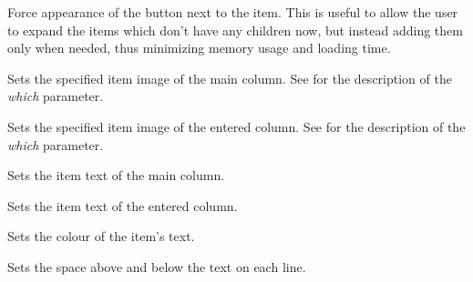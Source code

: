Force appearance of the button next to the item. This is useful to
allow the user to expand the items which don't have any children now,
but instead adding them only when needed, thus minimizing memory
usage and loading time.

\label{wxtreelistctrlsetitemimage}


Sets the specified item image of the main column. See 
for the description of the {\it which} parameter.


Sets the specified item image of the entered column. See 
for the description of the {\it which} parameter.

\label{wxtreelistctrlsetitemtext}


Sets the item text of the main column.


Sets the item text of the entered column.

\label{wxtreelistctrlsetitemtextcolour}


Sets the colour of the item's text.

\label{wxtreelistctrlsetindent}


Sets the space above and below the text on each line.

\label{wxtreelistctrlsetstateimagelist}


